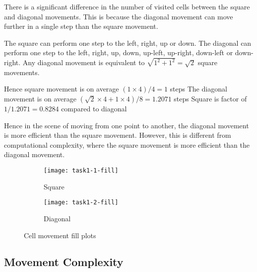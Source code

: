 There is a significant difference in the number of visited cells between the square and diagonal movements.
This is because the diagonal movement can move further in a single step than the square movement.

The square can perform one step to the left, right, up or down.
The diagonal can perform one step to the left, right, up, down, up-left, up-right, down-left or down-right.
Any diagonal movement is equivalent to $\sqrt{1^2 + 1^2} = \sqrt{2}$ square movements.

Hence square movement is on average $(1 \times 4) / 4 = 1$ steps
The diagonal movement is on average $(\sqrt{2} \times 4 + 1 \times 4) / 8 = 1.2071$ steps
Square is factor of $1 / 1.2071 = 0.8284$ compared to diagonal

Hence in the scene of moving from one point to another, the diagonal movement is more efficient than the square movement.
However, this is different from computational complexity, where the square movement is more efficient than the diagonal movement.



\clearpage

\begin{figure}[ht]
    \centering
    \begin{subfigure}{\textwidth}
        \centering
        \texttt{[image: task1-1-fill]}
        \caption[Square]{Square}
        \label{fig:task1-1-fill}
    \end{subfigure}
    \begin{subfigure}{\textwidth}
        \centering
        \texttt{[image: task1-2-fill]}
        \caption[Diagonal]{Diagonal}
        \label{fig:task1-2-fill}
    \end{subfigure}
    \caption[Cell movement fill plots]{Cell movement fill plots}
    \label{fig:task1-fill}
\end{figure}

\clearpage

\subsection{Movement Complexity}

